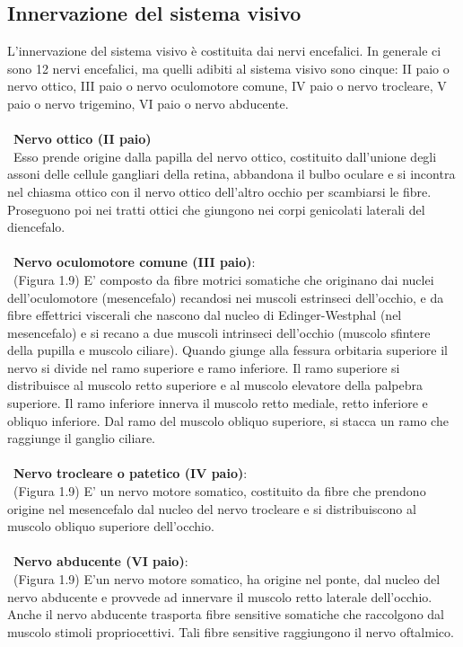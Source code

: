   
\subsection{Innervazione del sistema visivo}

L’innervazione del sistema visivo è costituita dai nervi encefalici. In generale ci sono 12 nervi encefalici, ma quelli adibiti al sistema visivo sono cinque: II paio o nervo ottico, III paio o nervo oculomotore comune, IV paio o nervo trocleare, V paio o nervo trigemino, VI paio o nervo abducente.
\\\ \\\
\textbf{Nervo ottico (II paio)}
\\\ 
Esso prende origine dalla papilla del nervo ottico, costituito dall’unione degli assoni delle cellule gangliari della retina, abbandona il bulbo oculare e si incontra nel chiasma ottico con il nervo ottico dell'altro occhio per scambiarsi le fibre. Proseguono poi nei tratti ottici che giungono nei corpi genicolati laterali del diencefalo.
\\\ \\\
\textbf{Nervo oculomotore comune (III paio)}: 
\\\ 
(Figura 1.9) E' composto da fibre motrici somatiche che originano dai nuclei dell’oculomotore (mesencefalo) recandosi nei muscoli estrinseci dell’occhio, e da fibre effettrici 	viscerali che nascono dal nucleo di Edinger-Westphal (nel mesencefalo) e si recano a due muscoli intrinseci dell’occhio (muscolo sfintere della pupilla e muscolo ciliare). Quando giunge alla fessura orbitaria superiore il nervo si divide nel ramo superiore e ramo inferiore. Il ramo superiore si distribuisce al muscolo retto superiore e al muscolo elevatore della palpebra superiore. Il ramo inferiore innerva il muscolo retto mediale, retto inferiore e obliquo inferiore. Dal ramo del muscolo obliquo superiore, si stacca un ramo che raggiunge il ganglio ciliare.
\\\ \\\
\textbf{Nervo trocleare o patetico (IV paio)}: 
\\\ 
(Figura 1.9) E' un nervo motore somatico, costituito da fibre che prendono origine nel mesencefalo dal nucleo del nervo trocleare e si distribuiscono al muscolo obliquo superiore dell’occhio.
\\\ \\\
\textbf{Nervo abducente (VI paio)}: 
\\\ 
(Figura 1.9) E'un nervo motore somatico, ha origine nel ponte, dal nucleo del nervo abducente e provvede ad innervare il muscolo retto laterale dell’occhio. Anche il nervo abducente trasporta fibre sensitive somatiche che raccolgono dal muscolo stimoli propriocettivi. Tali fibre sensitive raggiungono il nervo oftalmico.
